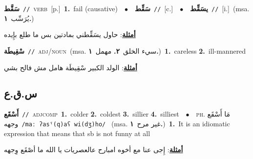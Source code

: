 \documentclass[10pt,a4paper,twoside]{article} %
\begin{document}
\begin{multicols}{2}
{\setlength\topsep{0pt}\textbf{\foreignlanguage{arabic}{سَقَّط}}\ {\color{gray}\texttt{//}\color{black}}\ \textsc{verb}\ [p.]\ \textbf{1.}~fail (causative)\ \ $\bullet$\ \ \setlength\topsep{0pt}\textbf{\foreignlanguage{arabic}{سَقِّط}}\ {\color{gray}\texttt{//}\color{black}}\ [c.]\ \ $\bullet$\ \ \setlength\topsep{0pt}\textbf{\foreignlanguage{arabic}{يسَقِّط}}\ {\color{gray}\texttt{//}\color{black}}\ [i.]\ \color{gray}(msa. \foreignlanguage{arabic}{يُرَسِّب}~\foreignlanguage{arabic}{\textbf{١.}})\color{black}\  \begin{flushright}\color{gray}\foreignlanguage{arabic}{\textbf{\underline{\foreignlanguage{arabic}{أمثلة}}}: حاول يسَقِّطني بمادتين بس ما طلع بإِيده}\end{flushright}\color{black}} \vspace{2mm}

{\setlength\topsep{0pt}\textbf{\foreignlanguage{arabic}{سْقِيطَة}}\ {\color{gray}\texttt{//}\color{black}}\ \textsc{adj/noun}\ \color{gray}(msa. \foreignlanguage{arabic}{سيء الخلق}~\foreignlanguage{arabic}{\textbf{٢.}}  \foreignlanguage{arabic}{مهمل}~\foreignlanguage{arabic}{\textbf{١.}})\color{black}\ \textbf{1.}~careless  \textbf{2.}~ill-mannered\  \begin{flushright}\color{gray}\foreignlanguage{arabic}{\textbf{\underline{\foreignlanguage{arabic}{أمثلة}}}: الولد الكبير سْقِيطَة هامل مش فالح بشي}\end{flushright}\color{black}} \vspace{2mm}

\vspace{-3mm}
\subsection*{\color{blue}\foreignlanguage{arabic}{س.ق.ع}\color{blue}{}} 

{\setlength\topsep{0pt}\textbf{\foreignlanguage{arabic}{أَسْقَع}}\ {\color{gray}\texttt{//}\color{black}}\ \textsc{adj\textunderscore comp}\ \textbf{1.}~colder  \textbf{2.}~coldest  \textbf{3.}~sillier  \textbf{4.}~silliest\ \ $\bullet$\ \ \textsc{ph.} \color{gray} \foreignlanguage{arabic}{مَا أَسْقَع وجهه}\color{black}\ {\color{gray}\texttt{/{\sffamily maː ʔasˤ(q)aʕ wi(dʒ)ho}/}\color{black}}\ \color{gray} (msa. \foreignlanguage{arabic}{غير مرح}~\foreignlanguage{arabic}{\textbf{١.}})\color{black}\ \textbf{1.}~It is an idiomatic expression that means that sb is not funny at all\  \begin{flushright}\color{gray}\foreignlanguage{arabic}{\textbf{\underline{\foreignlanguage{arabic}{أمثلة}}}: إِجى عنا مع أخوه امبارح عالعصريات يا الله ما أصْقَع وِجهه}\end{flushright}\color{black}} \vspace{2mm}


\end{multicols}
\end{document}
